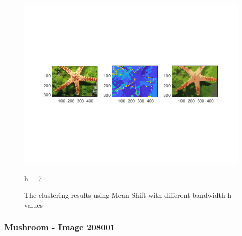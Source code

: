 \documentclass[12pt]{article}
\begin{document}
\begin{figure}[H]
\begin{minipage}{.5\textwidth}
		\includegraphics[width=\textwidth,height=\textheight,keepaspectratio]{figs/2-a-ms-1-h7}
		\caption{\small h = 7}
	\end{minipage}
	\caption{The clustering results using Mean-Shift with different bandwidth h values}
  \end{figure}

\subsubsection{Mushroom - Image 208001}
\end{document}
